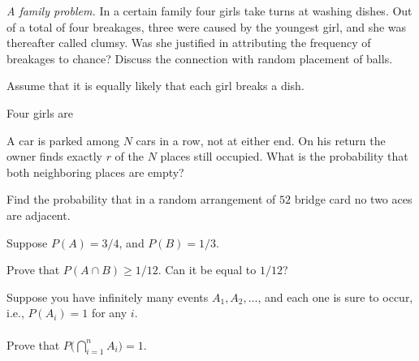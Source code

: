 \begin{problem}[Handout 2, \# 14]
  \emph{A family problem.} In a certain family four girls take turns at
  washing dishes. Out of a total of four breakages, three were caused by
  the youngest girl, and she was thereafter called clumsy. Was she
  justified in attributing the frequency of breakages to chance? Discuss
  the connection with random placement of balls.
\end{problem}
\begin{solution}
Assume that it is equally likely that each girl breaks a dish.

Four girls are 
\end{solution}
\newpage

\begin{problem}[Handout 2, \# 15]
  A car is parked among \(N\) cars in a row, not at either end. On his
  return the owner finds exactly \(r\) of the \(N\) places still
  occupied. What is the probability that both neighboring places are empty?
\end{problem}
\begin{solution}

\end{solution}
\newpage

\begin{problem}[Handout 2, \# 16]
  Find the probability that in a random arrangement of \(52\) bridge card
  no two aces are adjacent.
\end{problem}
\begin{solution}

\end{solution}
\newpage

\begin{problem}[Handout 2, \# 17]
  Suppose \(P(A)=3/4\), and \(P(B)=1/3\).

  Prove that \(P(A\cap B)\geq 1/12\). Can it be equal to \(1/12\)?
\end{problem}
\begin{solution}

\end{solution}
\newpage

\begin{problem}[Handout 2, \# 18]
  Suppose you have infinitely many events \(A_1,A_2,\dotsc\), and each one
  is sure to occur, i.e., \(P(A_i)=1\) for any \(i\).
  \\\\
  Prove that \(P\bigl(\bigcap_{i=1}^n A_i\bigr)=1\).
\end{problem}
\begin{solution}

\end{solution}
\newpage

